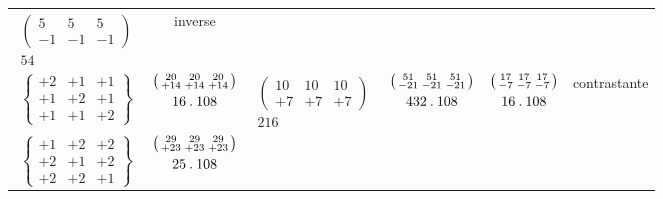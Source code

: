 \begin{center}
\begin{tabular}{ccccc l}
$\begin{gathered}\left(\begin{smallmatrix}5&5&5\\-1&-1&-1\end{smallmatrix}\right)\\54\end{gathered}$&inverse\\[1.4ex]
$\left\{\begin{smallmatrix}+2&+1&+1\\+1&+2&+1\\+1&+1&+2\end{smallmatrix}\right\}$&
$\begin{gathered}\left(\begin{smallmatrix}20&20&20\\+14&+14&+14\end{smallmatrix}\right)\\16\mathbin{.}108\end{gathered}$&
$\begin{gathered}\left(\begin{smallmatrix}10&10&10\\+7&+7&+7\end{smallmatrix}\right)\\216\end{gathered}$&
$\begin{gathered}\left(\begin{smallmatrix}51&51&51\\-21&-21&-21\end{smallmatrix}\right)\\432\mathbin{.}108\end{gathered}$&
$\begin{gathered}\left(\begin{smallmatrix}17&17&17\\-7&-7&-7\end{smallmatrix}\right)\\16\mathbin{.}108\end{gathered}$&contrastante\\[1.4ex]
$\left\{\begin{smallmatrix}+1&+2&+2\\+2&+1&+2\\+2&+2&+1\end{smallmatrix}\right\}$&
$\begin{gathered}\left(\begin{smallmatrix}29&29&29\\+23&+23&+23\end{smallmatrix}\right)\\25\mathbin{.}108\end{gathered}$&&

\end{tabular}
\end{center}

